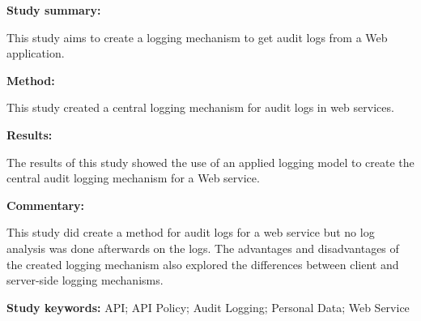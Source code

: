 \begin{tcolorbox}[colback=gray!5!white, colframe=pastelgreen!40!black, title=Central Audit Logging Mechanism in Personal Data Web Services\cite{Hasiloglu2018}]
	\begin{minipage}[t]{0.25\textwidth}
		\textbf{Study summary:}
	\end{minipage}
	\hfill
	\begin{minipage}[t]{0.65\textwidth}
		This study aims to create a logging mechanism to get audit logs from a Web application.
	\end{minipage}

	\vspace{0.75em} 

	\begin{minipage}[t]{0.25\textwidth}
		\textbf{Method:}
	\end{minipage}
	\hfill
	\begin{minipage}[t]{0.65\textwidth}
		This study created a central logging mechanism for audit logs in web services.
	\end{minipage}

	\vspace{0.75em} 

	\begin{minipage}[t]{0.25\textwidth}
		\textbf{Results:}
	\end{minipage}
	\hfill
	\begin{minipage}[t]{0.65\textwidth}
		The results of this study showed the use of an applied logging model to create the central audit logging mechanism for a Web service.	
	\end{minipage}

	\vspace{0.75em} 

	\begin{minipage}[t]{0.25\textwidth}
		\textbf{Commentary:}
	\end{minipage}
	\hfill
	\begin{minipage}[t]{0.65\textwidth}
		This study did create a method for audit logs for a web service but no log analysis was done afterwards on the logs. The advantages and disadvantages of the created logging mechanism also explored the differences between client and server-side logging mechanisms. 
	\end{minipage}
	\tcblower
	\textbf{Study keywords:} API; API Policy; Audit Logging; Personal Data; Web Service
\end{tcolorbox}

